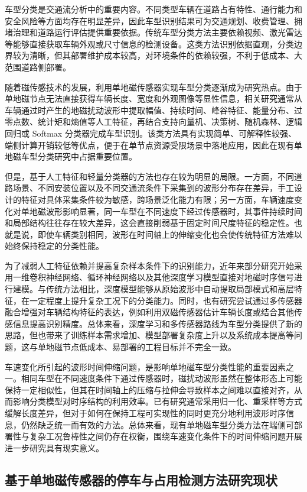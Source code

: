 车型分类是交通流分析中的重要内容。不同类型车辆在道路占有特性、通行能力和安全风险等方面均存在明显差异，因此车型识别结果可为交通规划、收费管理、拥堵治理和道路运行评估提供重要依据。传统车型分类方法主要依赖视频、激光雷达等能够直接获取车辆外观或尺寸信息的检测设备。这类方法识别依据直观，分类边界较为清晰，但其部署维护成本较高，对环境条件的依赖较强，不利于低成本、大范围道路侧部署。

随着磁传感技术的发展，利用单地磁传感器实现车型分类逐渐成为研究热点。由于单地磁节点无法直接获得车辆长度、宽度和外观图像等显性信息，相关研究通常从车辆通过时产生的地磁扰动波形中提取幅值、持续时间、峰谷特征、能量分布、过零点数、统计矩和熵值等人工特征，再结合支持向量机、决策树、随机森林、逻辑回归或 Softmax 分类器完成车型识别。该类方法具有实现简单、可解释性较强、端侧计算开销较低等优点，便于在单节点资源受限场景中落地应用，因此在现有单地磁车型分类研究中占据重要位置。

但是，基于人工特征和轻量分类器的方法也存在较为明显的局限。一方面，不同道路场景、不同安装位置以及不同交通流条件下采集到的波形分布存在差异，手工设计的特征对具体采集条件较为敏感，跨场景泛化能力有限；另一方面，车辆速度变化对单地磁波形影响显著，同一车型在不同速度下经过传感器时，其事件持续时间和局部结构往往存在较大差异，这会直接削弱基于固定时间尺度特征的稳定性。也就是说，即使车辆类别相同，波形在时间轴上的伸缩变化也会使传统特征方法难以始终保持稳定的分类性能。

为了减弱人工特征依赖并提高复杂样本条件下的识别能力，近年来部分研究开始采用一维卷积神经网络、循环神经网络以及其他深度学习模型直接对地磁时序信号进行建模。与传统方法相比，深度模型能够从原始波形中自动提取局部模式和高层特征，在一定程度上提升复杂工况下的分类能力。同时，也有研究尝试通过多传感器融合增强对车辆结构特征的表达，例如利用双磁传感器估计车辆长度或结合其他传感信息提高识别精度。总体来看，深度学习和多传感器路线为车型分类提供了新的思路，但也带来了训练样本需求增加、模型部署复杂度上升以及系统成本提高等问题，这与单地磁节点低成本、易部署的工程目标并不完全一致。

车速变化所引起的波形时间伸缩问题，是影响单地磁车型分类性能的重要因素之一。相同车型在不同速度条件下通过传感器时，磁扰动波形虽然在整体形态上可能保持一定相似性，但其在时间轴上的压缩与拉伸会导致样本之间难以直接对齐，从而影响分类模型对时序结构的利用效率。已有研究通常采用归一化、重采样等方式缓解长度差异，但对于如何在保持工程可实现性的同时更充分地利用波形时序信息，仍然缺乏统一而有效的方法。总体来看，现有单地磁车型分类方法在端侧可部署性与复杂工况鲁棒性之间仍存在权衡，围绕车速变化条件下的时间伸缩问题开展进一步研究具有现实意义。

\subsection{基于单地磁传感器的停车与占用检测方法研究现状}
\label{sec:related_parking_detection}

